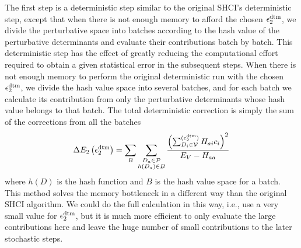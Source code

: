 \documentclass[%
preprint,
 superscriptaddress,
 amsmath,amssymb,
 aps,
]{revtex4-1}
\def\beq{\begin{eqnarray}}
\def\eeq{\end{eqnarray}}
\def\V{\mathcal{V}}
\def\P{\mathcal{P}}
\begin{document}
The first step is a deterministic step similar to the original SHCI's deterministic step,
except that when there is not enough memory to afford the
chosen $\epsilon_2^{\rm dtm}$, we divide the perturbative space into batches according to the hash value of the perturbative determinants and evaluate their contributions batch by batch.
This deterministic step has the effect of greatly reducing the computational effort required to obtain a given statistical
error in the subsequent steps.
When there is not enough memory to perform the original deterministic run with the
chosen $\epsilon_2^{\rm dtm}$, we divide the hash value space into several batches, and for each batch
we calculate its contribution from only the perturbative determinants whose hash value belongs to that batch.
The total deterministic correction is simply the sum of the corrections from all the batches
\beq
\Delta E_{2} \left(\epsilon_2^{\rm dtm} \right) = \sum_{B} \sum_{\substack{D_{a} \in \P \\ h(D_a)\in B}} \frac{\left(\sum^{(\epsilon_2^{\rm dtm})}_{D_{i} \in \V} H_{a i} c_{i}\right) ^{2}}{E_{V} - H_{a a}}
\eeq
where $h(D)$ is the hash function and $B$ is the hash value space for a batch.
This method solves the memory bottleneck in a different way than the original SHCI algorithm.
We could do the full calculation in this way, i.e., use a very small value for $\epsilon_2^{\rm dtm}$,
but it is much more efficient to only evaluate the large contributions here and leave the huge number of small contributions to the later stochastic steps.
\end{document}

